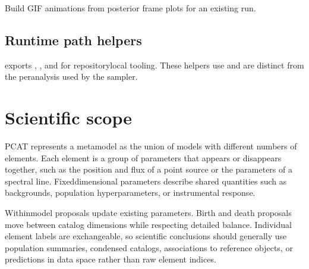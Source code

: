 \documentclass[letterpaper,10pt,english]{sphinxmanual}
\begin{document}

\begin{fulllineitems}
\label{\detokenize{api:pcat.main.proc_anim}}
\pysigstartsignatures
\pysiglinewithargsret
{}
{\sphinxparamcomma {}}
{}
\pysigstopsignatures
\sphinxAtStartPar
Build GIF animations from posterior frame plots for an existing run.

\end{fulllineitems}



\section{Runtime path helpers}
\label{\detokenize{api:runtime-path-helpers}}
\sphinxAtStartPar
{} exports , , and
 for repository\sphinxhyphen{}local tooling. These helpers use
 and are distinct from the per\sphinxhyphen{}analysis  used by the
sampler.


\chapter{Scientific scope}
\label{\detokenize{index:scientific-scope}}
\sphinxAtStartPar
PCAT represents a metamodel as the union of models with different numbers of
elements. Each element is a group of parameters that appears or disappears
together, such as the position and flux of a point source or the parameters of a
spectral line. Fixed\sphinxhyphen{}dimensional parameters describe shared quantities such as
backgrounds, population hyperparameters, or instrumental response.

\sphinxAtStartPar
Within\sphinxhyphen{}model proposals update existing parameters. Birth and death proposals
move between catalog dimensions while respecting detailed balance. Individual
element labels are exchangeable, so scientific conclusions should generally use
population summaries, condensed catalogs, associations to reference objects, or
predictions in data space rather than raw element indices.
\end{document}
